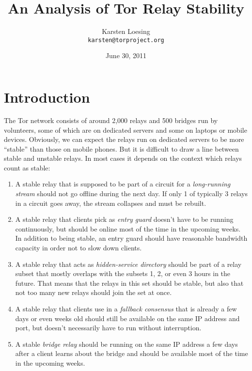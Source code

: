 \documentclass{article}
\begin{document}
\title{An Analysis of Tor Relay Stability}
\author{Karsten Loesing\\{\tt karsten@torproject.org}}
\date{June 30, 2011}

\maketitle

\section{Introduction}

The Tor network consists of around 2,000 relays and 500 bridges run by
volunteers, some of which are on dedicated servers and some on laptops or
mobile devices.
Obviously, we can expect the relays run on dedicated servers to be more
``stable'' than those on mobile phones.
But it is difficult to draw a line between stable and unstable relays.
In most cases it depends on the context which relays count as stable:

\begin{enumerate}
\item A stable relay that is supposed to be part of a circuit for a
\emph{long-running stream} should not go offline during the next day.
If only 1 of typically 3 relays in a circuit goes away, the stream
collapses and must be rebuilt.
\item A stable relay that clients pick as \emph{entry guard} doesn't have
to be running continuously, but should be online most of the time in the
upcoming weeks.
In addition to being stable, an entry guard should have reasonable
bandwidth capacity in order not to slow down clients.
\item A stable relay that acts as \emph{hidden-service directory} should
be part of a relay subset that mostly overlaps with the subsets 1, 2, or
even 3 hours in the future.
That means that the relays in this set should be stable, but also that not
too many new relays should join the set at once.
\item A stable relay that clients use in a \emph{fallback consensus}
\cite{proposal146} that is already a few days or even weeks old should
still be available on the same IP address and port, but
doesn't necessarily have to run without interruption.
\item A stable \emph{bridge relay} should be running on the same IP
address a few days after a client learns about the bridge and should be
available most of the time in the upcoming weeks.
\end{enumerate}
\end{document}
